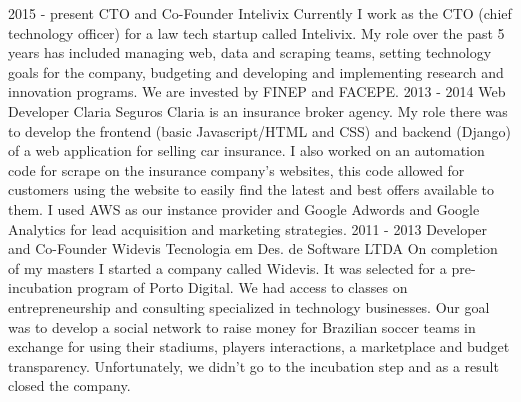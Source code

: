 
\cvevent
    {2015 - present}
    {CTO and Co-Founder}
    {Intelivix}
    {Currently I work as the CTO (chief technology officer) for a law tech startup called Intelivix. My role over the past 5 years has included managing web, data and scraping teams, setting technology goals for the company, budgeting and developing and implementing research and innovation programs. We are invested by FINEP and FACEPE.}
    {}
    {}
    {}
\cvevent
    {2013 - 2014}
    {Web Developer}
    {Claria Seguros}
    {Claria is an insurance broker agency. My role there was to develop the frontend (basic Javascript/HTML and CSS) and backend (Django) of a web application for selling car insurance. I also worked on an automation code for scrape on the insurance company’s websites, this code allowed for customers using the website to easily find the latest and best offers available to them. I used AWS as our instance provider and Google Adwords and Google Analytics for lead acquisition and marketing strategies.}
    {}
    {}
    {}
\cvevent
    {2011 - 2013}
    {Developer and Co-Founder}
    {Widevis Tecnologia em Des. de Software LTDA}
    {On completion of my masters I started a company called Widevis. It was selected for a pre-incubation program of Porto Digital. We had access to classes on entrepreneurship and consulting specialized in technology businesses. Our goal was to develop a social network to raise money for Brazilian soccer teams in exchange for using their stadiums, players interactions, a marketplace and budget transparency. Unfortunately, we didn’t go to the incubation step and as a result closed the company.}
